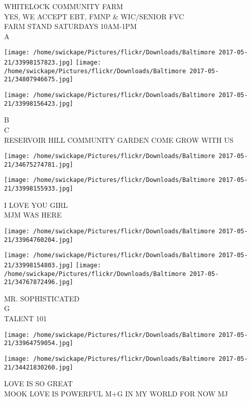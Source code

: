 \documentclass[10pt,letterpaper]{article}
\begin{document}
WHITELOCK COMMUNITY FARM\\
YES, WE ACCEPT EBT, FMNP \& WIC/SENIOR FVC\\
FARM STAND SATURDAYS 10AM{-}1PM\\
A\\
\pagebreak

\texttt{[image: /home/swickape/Pictures/flickr/Downloads/Baltimore 2017-05-21/33998157823.jpg]}
\texttt{[image: /home/swickape/Pictures/flickr/Downloads/Baltimore 2017-05-21/34807946675.jpg]}

\texttt{[image: /home/swickape/Pictures/flickr/Downloads/Baltimore 2017-05-21/33998156423.jpg]}

B\\
C\\
RESERVOIR HILL COMMUNITY GARDEN COME GROW WITH US\\
\pagebreak

\texttt{[image: /home/swickape/Pictures/flickr/Downloads/Baltimore 2017-05-21/34675274781.jpg]}

\vspace{0.25in}
\texttt{[image: /home/swickape/Pictures/flickr/Downloads/Baltimore 2017-05-21/33998155933.jpg]}

I LOVE YOU GIRL\\
MJM WAS HERE\\
\pagebreak

\texttt{[image: /home/swickape/Pictures/flickr/Downloads/Baltimore 2017-05-21/33964760204.jpg]}

\vspace{0.25in}
\texttt{[image: /home/swickape/Pictures/flickr/Downloads/Baltimore 2017-05-21/33998154803.jpg]}
\texttt{[image: /home/swickape/Pictures/flickr/Downloads/Baltimore 2017-05-21/34767872496.jpg]}

MR. SOPHISTICATED\\
G\\
TALENT 101\\
\pagebreak

\texttt{[image: /home/swickape/Pictures/flickr/Downloads/Baltimore 2017-05-21/33964759054.jpg]}

\vspace{0.25in}
\texttt{[image: /home/swickape/Pictures/flickr/Downloads/Baltimore 2017-05-21/34421830260.jpg]}

LOVE IS SO GREAT\\
MOOK LOVE IS POWERFUL M+G IN MY WORLD FOR NOW MJ\\
\pagebreak
\end{document}
